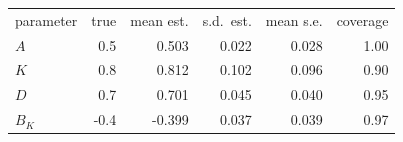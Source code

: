 \begin{ruledtabular}
\begin{tabular}{lrrrrr}
parameter & true & mean est. & s.d.\ est. & mean s.e. & coverage \\
\colrule
$A$ & 0.5 & 0.503 & 0.022 & 0.028 & 1.00 \\
$K$ & 0.8 & 0.812 & 0.102 & 0.096 & 0.90 \\
$D$ & 0.7 & 0.701 & 0.045 & 0.040 & 0.95 \\
$B_K$ & -0.4 & -0.399 & 0.037 & 0.039 & 0.97 \\
\end{tabular}
\end{ruledtabular}
